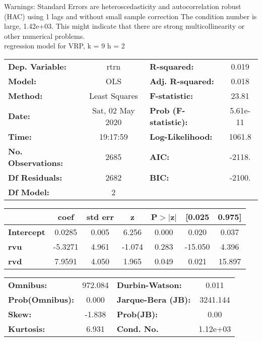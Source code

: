 Warnings: \newline
 [1] Standard Errors are heteroscedasticity and autocorrelation robust (HAC) using 1 lags and without small sample correction \newline
 [2] The condition number is large, 1.42e+03. This might indicate that there are \newline
 strong multicollinearity or other numerical problems.\\ 

regression model for VRP, k = 9 h = 2\begin{center}
\begin{tabular}{lclc}
\toprule
\textbf{Dep. Variable:}    &       rtrn       & \textbf{  R-squared:         } &     0.019   \\
\textbf{Model:}            &       OLS        & \textbf{  Adj. R-squared:    } &     0.018   \\
\textbf{Method:}           &  Least Squares   & \textbf{  F-statistic:       } &     23.81   \\
\textbf{Date:}             & Sat, 02 May 2020 & \textbf{  Prob (F-statistic):} &  5.61e-11   \\
\textbf{Time:}             &     19:17:59     & \textbf{  Log-Likelihood:    } &    1061.8   \\
\textbf{No. Observations:} &        2685      & \textbf{  AIC:               } &    -2118.   \\
\textbf{Df Residuals:}     &        2682      & \textbf{  BIC:               } &    -2100.   \\
\textbf{Df Model:}         &           2      & \textbf{                     } &             \\
\bottomrule
\end{tabular}
\begin{tabular}{lcccccc}
                   & \textbf{coef} & \textbf{std err} & \textbf{z} & \textbf{P$> |$z$|$} & \textbf{[0.025} & \textbf{0.975]}  \\
\midrule
\textbf{Intercept} &       0.0285  &        0.005     &     6.256  &         0.000        &        0.020    &        0.037     \\
\textbf{rvu}       &      -5.3271  &        4.961     &    -1.074  &         0.283        &      -15.050    &        4.396     \\
\textbf{rvd}       &       7.9591  &        4.050     &     1.965  &         0.049        &        0.021    &       15.897     \\
\bottomrule
\end{tabular}
\begin{tabular}{lclc}
\textbf{Omnibus:}       & 972.084 & \textbf{  Durbin-Watson:     } &    0.011  \\
\textbf{Prob(Omnibus):} &   0.000 & \textbf{  Jarque-Bera (JB):  } & 3241.144  \\
\textbf{Skew:}          &  -1.838 & \textbf{  Prob(JB):          } &     0.00  \\
\textbf{Kurtosis:}      &   6.931 & \textbf{  Cond. No.          } & 1.12e+03  \\
\bottomrule
\end{tabular}
\end{center}

